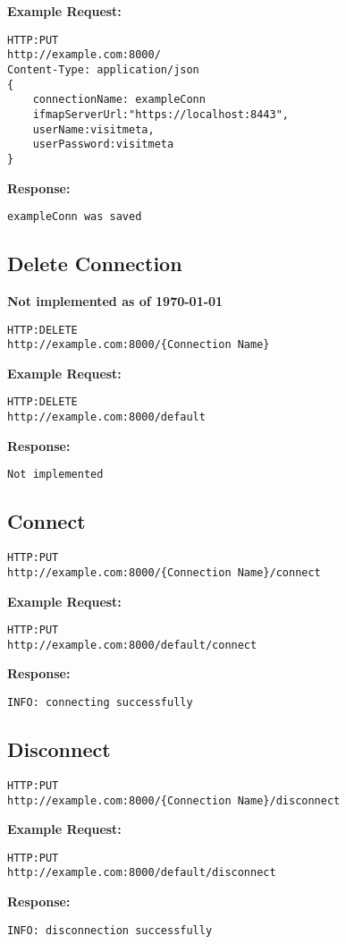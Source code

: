 \textbf{Example Request:}
\begin{lstlisting}
HTTP:PUT
http://example.com:8000/
Content-Type: application/json
{
	connectionName: exampleConn
	ifmapServerUrl:"https://localhost:8443",
	userName:visitmeta,
	userPassword:visitmeta
}
\end{lstlisting}

\textbf{Response:}
\begin{lstlisting}
exampleConn was saved
\end{lstlisting}

\subsection{Delete Connection}
\textbf{Not implemented as of \today}
\begin{lstlisting}
HTTP:DELETE
http://example.com:8000/{Connection Name}
\end{lstlisting}

\textbf{Example Request:}
\begin{lstlisting}
HTTP:DELETE
http://example.com:8000/default
\end{lstlisting}

\textbf{Response:}
\begin{lstlisting}
Not implemented
\end{lstlisting}

\subsection{Connect}
\begin{lstlisting}
HTTP:PUT
http://example.com:8000/{Connection Name}/connect
\end{lstlisting}

\textbf{Example Request:}
\begin{lstlisting}
HTTP:PUT
http://example.com:8000/default/connect
\end{lstlisting}

\textbf{Response:}
\begin{lstlisting}
INFO: connecting successfully
\end{lstlisting}

\subsection{Disconnect}
\begin{lstlisting}
HTTP:PUT
http://example.com:8000/{Connection Name}/disconnect
\end{lstlisting}

\textbf{Example Request:}
\begin{lstlisting}
HTTP:PUT
http://example.com:8000/default/disconnect
\end{lstlisting}

\textbf{Response:}
\begin{lstlisting}
INFO: disconnection successfully
\end{lstlisting}